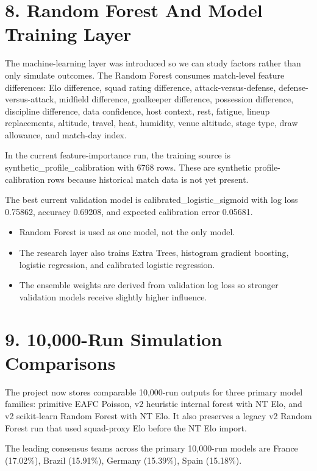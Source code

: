 \documentclass[10pt]{article}
\begin{document}
\section{8. Random Forest And Model Training Layer}

The machine-learning layer was introduced so we can study factors rather than only simulate outcomes. The Random Forest consumes match-level feature differences: Elo difference, squad rating difference, attack-versus-defense, defense-versus-attack, midfield difference, goalkeeper difference, possession difference, discipline difference, data confidence, host context, rest, fatigue, lineup replacements, altitude, travel, heat, humidity, venue altitude, stage type, draw allowance, and match-day index.

In the current feature-importance run, the training source is synthetic\_profile\_calibration with 6768 rows. These are synthetic profile-calibration rows because historical match data is not yet present.

The best current validation model is calibrated\_logistic\_sigmoid with log loss 0.75862, accuracy 0.69208, and expected calibration error 0.05681.

\begin{itemize}
  \item Random Forest is used as one model, not the only model.
  \item The research layer also trains Extra Trees, histogram gradient boosting, logistic regression, and calibrated logistic regression.
  \item The ensemble weights are derived from validation log loss so stronger validation models receive slightly higher influence.
\end{itemize}

\section{9. 10,000-Run Simulation Comparisons}

The project now stores comparable 10,000-run outputs for three primary model families: primitive EAFC Poisson, v2 heuristic internal forest with NT Elo, and v2 scikit-learn Random Forest with NT Elo. It also preserves a legacy v2 Random Forest run that used squad-proxy Elo before the NT Elo import.

The leading consensus teams across the primary 10,000-run models are France (17.02\%), Brazil (15.91\%), Germany (15.39\%), Spain (15.18\%).
\end{document}
